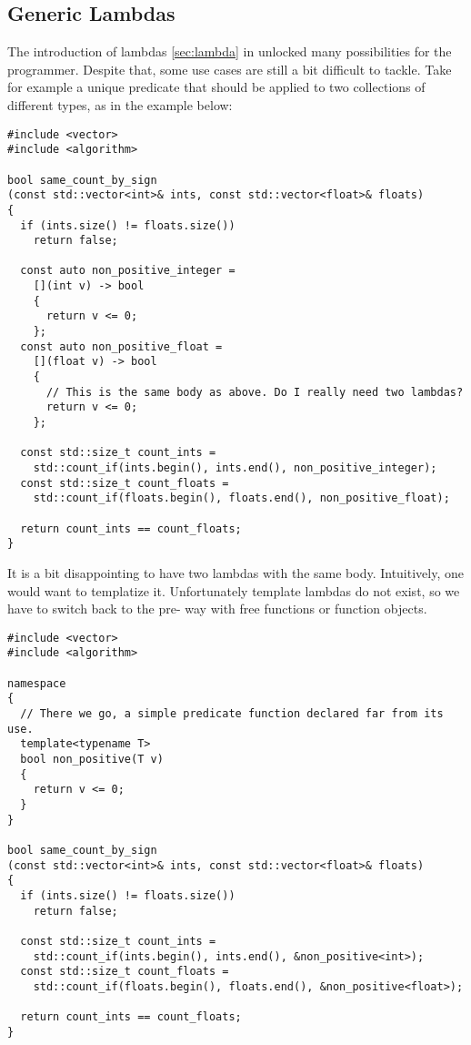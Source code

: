 \subsection{Generic Lambdas}

The introduction of lambdas \ref{sec:lambda} in  unlocked many
possibilities for the programmer. Despite that, some use cases are
still a bit difficult to tackle. Take for example a unique predicate
that should be applied to two collections of different types, as in
the example below:

\begin{lstlisting}
#include <vector>
#include <algorithm>

bool same_count_by_sign
(const std::vector<int>& ints, const std::vector<float>& floats)
{
  if (ints.size() != floats.size())
    return false;

  const auto non_positive_integer =
    [](int v) -> bool
    {
      return v <= 0;
    };
  const auto non_positive_float =
    [](float v) -> bool
    {
      // This is the same body as above. Do I really need two lambdas?
      return v <= 0;
    };

  const std::size_t count_ints =
    std::count_if(ints.begin(), ints.end(), non_positive_integer);
  const std::size_t count_floats =
    std::count_if(floats.begin(), floats.end(), non_positive_float);

  return count_ints == count_floats;
}
\end{lstlisting}

It is a bit disappointing to have two lambdas with the same
body. Intuitively, one would want to templatize it. Unfortunately
template lambdas do not exist, so we have to switch back to the
pre- way with free functions or function objects.

\begin{lstlisting}
#include <vector>
#include <algorithm>

namespace
{
  // There we go, a simple predicate function declared far from its use.
  template<typename T>
  bool non_positive(T v)
  {
    return v <= 0;
  }
}

bool same_count_by_sign
(const std::vector<int>& ints, const std::vector<float>& floats)
{
  if (ints.size() != floats.size())
    return false;

  const std::size_t count_ints =
    std::count_if(ints.begin(), ints.end(), &non_positive<int>);
  const std::size_t count_floats =
    std::count_if(floats.begin(), floats.end(), &non_positive<float>);

  return count_ints == count_floats;
}
\end{lstlisting}

